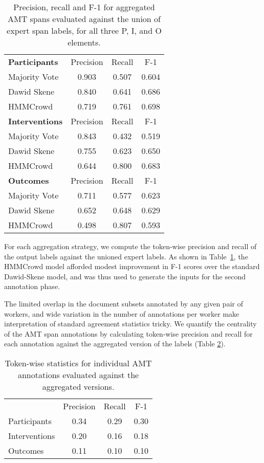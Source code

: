 \documentclass[11pt,a4paper]{article}
\begin{document}
\begin{table}\centering
    \small
    \begin{tabular}{  l c c c  }
        \hline
        \textbf{Participants} & Precision & Recall & F-1 \\
        \cline{2-4}
        Majority Vote   & 0.903  & 0.507  & 0.604  \\
        Dawid Skene     & 0.840  & 0.641  & 0.686  \\
        HMMCrowd        & 0.719  & 0.761  & 0.698  \\
        \hline
        \textbf{Interventions} & Precision & Recall & F-1 \\
        \cline{2-4}
        Majority Vote   & 0.843  & 0.432  & 0.519  \\
        Dawid Skene     & 0.755  & 0.623  & 0.650  \\
        HMMCrowd        & 0.644  & 0.800  & 0.683  \\
        \hline
        \textbf{Outcomes} & Precision & Recall & F-1 \\
        \cline{2-4}
        Majority Vote   & 0.711  & 0.577  & 0.623  \\
        Dawid Skene     & 0.652  & 0.648  & 0.629  \\
        HMMCrowd        & 0.498  & 0.807  & 0.593  \\
\end{tabular}
    \caption{Precision, recall and F-1 for aggregated AMT spans evaluated against the union of expert span labels, for all three P, I, and O elements.}
    \label{tab:basic_exp}
\end{table}

For each aggregation strategy, we compute the token-wise precision and recall of the output labels against the unioned expert labels.
As shown in Table~\ref{tab:basic_exp}, the HMMCrowd model afforded modest improvement in F-1 scores over the standard Dawid-Skene model, and was thus used to generate the inputs for the second annotation phase.


The limited overlap in the document subsets annotated by any given pair of workers, and wide variation in the number of annotations per worker make interpretation of standard agreement statistics tricky. We quantify the centrality of the AMT span annotations by calculating token-wise precision and recall for each annotation against the aggregated version of the labels (Table \ref{tab:amt_span_stats}). 




\begin{table}[h]\centering
    \small
    \begin{tabular}{ l c c c } 
\textbf{} & Precision & Recall & F-1\\
        \cline{2-4}
        Participants  & 0.34 & 0.29 & 0.30 \\
        Interventions & 0.20 & 0.16 & 0.18 \\ 
        Outcomes      & 0.11 & 0.10 & 0.10 \\ 
\end{tabular}
    \caption{Token-wise statistics for individual AMT annotations evaluated against the aggregated versions.}
   	\label{tab:amt_span_stats}
\end{table}
\end{document}
